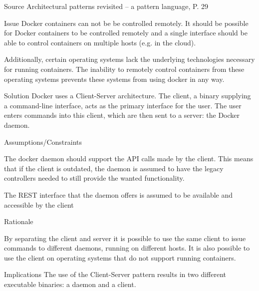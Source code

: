 \begin{patdescription}
\item [Source]
Architectural patterns revisited -- a pattern language, P. 29 \cite{avgeriou2005architectural}

\item [Issue]
Docker containers can not be be controlled remotely.
It should be possible for Docker containers to be controlled remotely and a single interface should be able to control containers on multiple hosts (e.g. in the cloud).

Additionally, certain operating systems lack the underlying technologies necessary for running containers. The inability to remotely control containers from these operating systems prevents these systems from using docker in any way.

\item [Solution]
Docker uses a {Client-Server} architecture. The client, a binary supplying a command-line interface, acts as the primary interface for the user. The user enters commands into this client, which are then sent to a server: the Docker daemon.


\item [Assumptions/Constraints]
\begin{mynesteditemlist}
\item The docker daemon should support the API calls made by the client. This means that if the client is outdated, the daemon is assumed to have the legacy controllers needed to still provide the wanted functionality.


\item The REST interface that the daemon offers is assumed to be available and accessible by the client
\end{mynesteditemlist}

\item [Rationale] 

By separating the client and server it is possible to use the same client to issue commands to different daemons, running on different hosts.
It is also possible to use the client on operating systems that do not support running containers.

\item [Implications]
The use of the {Client-Server} pattern results in two different executable binaries: a daemon and a client. 


\end{patdescription}
